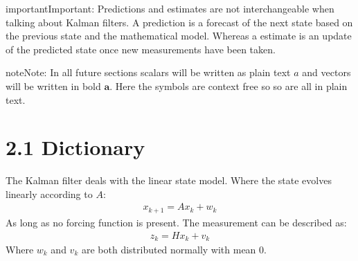 \documentclass[letterpaper,10pt,english]{jupyterBook}
\begin{document}
\begin{sphinxadmonition}{important}{Important:}
\sphinxAtStartPar
Predictions and estimates are not interchangeable when talking about Kalman filters. A prediction is a forecast of the next state based on the previous state and the mathematical model. Whereas a estimate is an update of the predicted state once new measurements have been taken.
\end{sphinxadmonition}

\begin{sphinxadmonition}{note}{Note:}
\sphinxAtStartPar
In all future sections scalars will be written as plain text \(a\) and vectors will be written in bold \(\boldsymbol{a}\). Here the symbols are context free so so are all in plain text.
\end{sphinxadmonition}


\section{2.1 Dictionary}
\label{\detokenize{2KalmanFilters:dictionary}}
\sphinxAtStartPar
The Kalman filter deals with the linear state model. Where the state evolves linearly according to \(A\):
\begin{equation}\label{equation:2KalmanFilters:state}
\begin{split}x_{k+1} = Ax_k + w_k\end{split}
\end{equation}
\sphinxAtStartPar
As long as no forcing function is present. The measurement can be described as:
\begin{equation}\label{equation:2KalmanFilters:measurement}
\begin{split}z_k = Hx_k + v_k \end{split}
\end{equation}
\sphinxAtStartPar
Where \(w_k\) and \(v_k\) are both distributed normally with mean \(0\).
\end{document}
